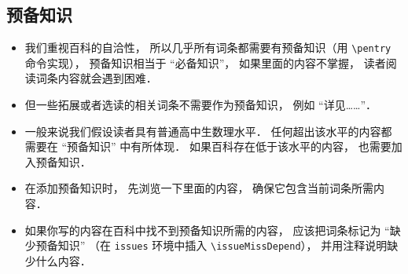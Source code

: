 
\subsection{预备知识}
\begin{itemize}
\item 我们重视百科的自洽性， 所以几乎所有词条都需要有预备知识（用 \verb|\pentry| 命令实现）， 预备知识相当于 “必备知识”， 如果里面的内容不掌握， 读者阅读词条内容就会遇到困难．
\item 但一些拓展或者选读的相关词条不需要作为预备知识， 例如 “详见……”．
\item 一般来说我们假设读者具有普通高中生数理水平． 任何超出该水平的内容都需要在 “预备知识” 中有所体现． 如果百科存在低于该水平的内容， 也需要加入预备知识．
\item 在添加预备知识时， 先浏览一下里面的内容， 确保它包含当前词条所需内容．
\item 如果你写的内容在百科中找不到预备知识所需的内容， 应该把词条标记为 “缺少预备知识” （在 \verb|issues| 环境中插入 \verb|\issueMissDepend|）， 并用注释说明缺少什么内容．
\end{itemize}
